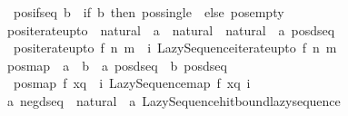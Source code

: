 \begin{isabellebody}
\isanewline
\ \ {\isachardoublequoteopen}pos{\isacharunderscore}{\kern0pt}if{\isacharunderscore}{\kern0pt}seq\ b\ {\isacharequal}{\kern0pt}\ {\isacharparenleft}{\kern0pt}if\ b\ then\ pos{\isacharunderscore}{\kern0pt}single\ {\isacharparenleft}{\kern0pt}{\isacharparenright}{\kern0pt}\ else\ pos{\isacharunderscore}{\kern0pt}empty{\isacharparenright}{\kern0pt}{\isachardoublequoteclose}\isanewline
\isanewline
{}\isamarkupfalse%
\ pos{\isacharunderscore}{\kern0pt}iterate{\isacharunderscore}{\kern0pt}upto\ {\isacharcolon}{\kern0pt}{\isacharcolon}{\kern0pt}\ {\isachardoublequoteopen}{\isacharparenleft}{\kern0pt}natural\ {\isasymRightarrow}\ {\isacharprime}{\kern0pt}a{\isacharparenright}{\kern0pt}\ {\isasymRightarrow}\ natural\ {\isasymRightarrow}\ natural\ {\isasymRightarrow}\ {\isacharprime}{\kern0pt}a\ pos{\isacharunderscore}{\kern0pt}dseq{\isachardoublequoteclose}\isanewline
{}\isanewline
\ \ {\isachardoublequoteopen}pos{\isacharunderscore}{\kern0pt}iterate{\isacharunderscore}{\kern0pt}upto\ f\ n\ m\ {\isacharequal}{\kern0pt}\ {\isacharparenleft}{\kern0pt}{\isasymlambda}i{\isachardot}{\kern0pt}\ Lazy{\isacharunderscore}{\kern0pt}Sequence{\isachardot}{\kern0pt}iterate{\isacharunderscore}{\kern0pt}upto\ f\ n\ m{\isacharparenright}{\kern0pt}{\isachardoublequoteclose}\isanewline
\ \isanewline
{}\isamarkupfalse%
\ pos{\isacharunderscore}{\kern0pt}map\ {\isacharcolon}{\kern0pt}{\isacharcolon}{\kern0pt}\ {\isachardoublequoteopen}{\isacharparenleft}{\kern0pt}{\isacharprime}{\kern0pt}a\ {\isasymRightarrow}\ {\isacharprime}{\kern0pt}b{\isacharparenright}{\kern0pt}\ {\isasymRightarrow}\ {\isacharprime}{\kern0pt}a\ pos{\isacharunderscore}{\kern0pt}dseq\ {\isasymRightarrow}\ {\isacharprime}{\kern0pt}b\ pos{\isacharunderscore}{\kern0pt}dseq{\isachardoublequoteclose}\isanewline
{}\isanewline
\ \ {\isachardoublequoteopen}pos{\isacharunderscore}{\kern0pt}map\ f\ xq\ {\isacharequal}{\kern0pt}\ {\isacharparenleft}{\kern0pt}{\isasymlambda}i{\isachardot}{\kern0pt}\ Lazy{\isacharunderscore}{\kern0pt}Sequence{\isachardot}{\kern0pt}map\ f\ {\isacharparenleft}{\kern0pt}xq\ i{\isacharparenright}{\kern0pt}{\isacharparenright}{\kern0pt}{\isachardoublequoteclose}%
\isadelimdocument
%
\endisadelimdocument
%
\isatagdocument
%
\isamarkuptrue%
%
\endisatagdocument
{\isafolddocument}%
%
\isadelimdocument
%
\endisadelimdocument
{}\isamarkupfalse%
\ {\isacharprime}{\kern0pt}a\ neg{\isacharunderscore}{\kern0pt}dseq\ {\isacharequal}{\kern0pt}\ {\isachardoublequoteopen}natural\ {\isasymRightarrow}\ {\isacharprime}{\kern0pt}a\ Lazy{\isacharunderscore}{\kern0pt}Sequence{\isachardot}{\kern0pt}hit{\isacharunderscore}{\kern0pt}bound{\isacharunderscore}{\kern0pt}lazy{\isacharunderscore}{\kern0pt}sequence{\isachardoublequoteclose}\isanewline

\end{isabellebody}
